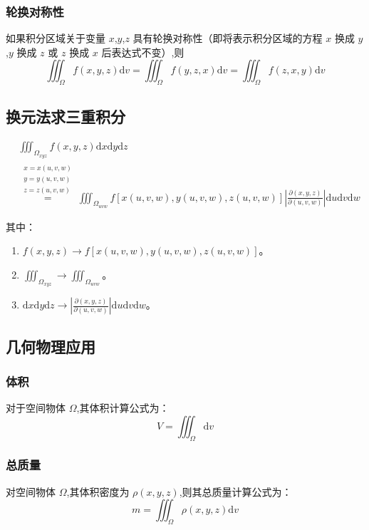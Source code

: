 \documentclass[UTF8]{ctexart}
\theoremstyle{remark}
\begin{document}
			\subsubsection{轮换对称性}
			如果积分区域关于变量 \( x \),\( y \),\( z \) 具有轮换对称性（即将表示积分区域的方程 \( x \) 换成 \( y \),\( y \) 换成 \( z \) 或 \( z \) 换成 \( x \) 后表达式不变）,则
			\[ 
			\iiint_{\Omega} f(x, y, z) \mathrm{d}v = \iiint_{\Omega} f(y, z, x) \mathrm{d}v = \iiint_{\Omega} f(z, x, y) \mathrm{d}v
			\]
			
		
			\subsection{换元法求三重积分}
			
			\begin{align*}
				&\iiint_{\Omega_{xyz}} f(x, y, z) \mathrm{d}x \mathrm{d}y \mathrm{d}z \\
				&\stackrel{\substack{x = x(u, v, w)\\y = y(u, v, w)\\z = z(u, v, w)}}{=} \iiint_{\Omega_{uvw}} f[x(u, v, w), y(u, v, w), z(u, v, w)] \left| \frac{\partial(x, y, z)}{\partial(u, v, w)} \right| \mathrm{d}u \mathrm{d}v \mathrm{d}w
			\end{align*}
			
			其中：
			\begin{enumerate}
				\item \( f(x, y, z) \to f[x(u, v, w), y(u, v, w), z(u, v, w)] \)。
				\item \( \iiint_{\Omega_{xyz}} \to \iiint_{\Omega_{uvw}} \)。
				\item \( \mathrm{d}x \mathrm{d}y \mathrm{d}z \to \left| \frac{\partial(x, y, z)}{\partial(u, v, w)} \right| \mathrm{d}u \mathrm{d}v \mathrm{d}w \)。
			\end{enumerate}
			
			\subsection{几何物理应用}
			\subsubsection{体积}
			对于空间物体 \( \Omega \),其体积计算公式为：
			\[ V = \iiint_{\Omega} \mathrm{d}v \]
			
			\subsubsection{总质量}
			对空间物体 \( \Omega \),其体积密度为 \( \rho(x, y, z) \),则其总质量计算公式为：
			\[ m = \iiint_{\Omega} \rho(x, y, z) \mathrm{d}v \]
			
\end{document}
